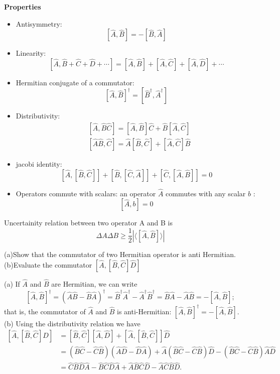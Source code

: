 \textbf{Properties}\\
\begin{itemize}
	\item Antisymmetry:\\
	$$[\hat{A}, \hat{B}]=-[\hat{B}, \hat{A}]$$
	\item Linearity:\\
	 $$[\hat{A}, \hat{B}+\hat{C}+\hat{D}+\cdots]=[\hat{A}, \hat{B}]+[\hat{A}, \hat{C}]+[\hat{A}, \hat{D}]+\cdots$$
	 \item  Hermitian conjugate of a commutator: \\
	 $$[\hat{A}, \hat{B}]^{\dagger}=\left[\hat{B}^{\dagger}, \hat{A}^{\dagger}\right]$$
	 \item  Distributivity: \\
	 $$\begin{aligned}
	 	&{[\hat{A}, \hat{B} \hat{C}]=[\hat{A}, \hat{B}] \hat{C}+\hat{B}[\hat{A}, \hat{C}]} \\
	 	&{[\hat{A} \hat{B}, \hat{C}]=\hat{A}[\hat{B}, \hat{C}]+[\hat{A}, \hat{C}] \hat{B}}
	 \end{aligned}$$
	 \item jacobi identity:\\
	 $$[\hat{A},[\hat{B}, \hat{C}]]+[\hat{B},[\hat{C}, \hat{A}]]+[\hat{C},[\hat{A}, \hat{B}]]=0$$
	 \item Operators commute with scalars: an operator $\hat{A}$ commutes with any scalar $b$ :
	 $$
	 [\hat{A}, b]=0
	 $$
\end{itemize}
\begin{note}
	Uncertainity relation between two operator A  and B is \\
	$$\Delta A \Delta B \geq \frac{1}{2}\left| \langle \left[ \hat{A},\hat{B}\right] \rangle \right| $$
\end{note}
\begin{exercise}
	(a)Show that the commutator of two Hermitian operator is anti Hermitian.\\
	(b)Evaluate the commutator $\left[ \hat{A},\left[ \hat{B},\hat{C}\right] \hat{D}\right] $
\end{exercise}
\begin{answer}
	(a) If $\hat{A}$ and $\hat{B}$ are Hermitian, we can write
	$$
	[\hat{A}, \hat{B}]^{\dagger}=(\hat{A} \hat{B}-\hat{B} \hat{A})^{\dagger}=\hat{B}^{\dagger} \hat{A}^{\dagger}-\hat{A}^{\dagger} \hat{B}^{\dagger}=\hat{B} \hat{A}-\hat{A} \hat{B}=-[\hat{A}, \hat{B}] ;
	$$
	that is, the commutator of $\hat{A}$ and $\hat{B}$ is anti-Hermitian: $[\hat{A}, \hat{B}]^{\dagger}=-[\hat{A}, \hat{B}]$.\\
	(b) Using the distributivity relation we have
	$$
	\begin{aligned}
	[\hat{A},[\hat{B}, \hat{C}] \hat{D}] &=[\hat{B}, \hat{C}][\hat{A}, \hat{D}]+[\hat{A},[\hat{B}, \hat{C}]] \hat{D} \\
	&=(\hat{B} \hat{C}-\hat{C} \hat{B})(\hat{A} \hat{D}-\hat{D} \hat{A})+\hat{A}(\hat{B} \hat{C}-\hat{C} \hat{B}) \hat{D}-(\hat{B} \hat{C}-\hat{C} \hat{B}) \hat{A} \hat{D} \\
	&=\hat{C} \hat{B} \hat{D} \hat{A}-\hat{B} \hat{C} \hat{D} \hat{A}+\hat{A} \hat{B} \hat{C} \hat{D}-\hat{A} \hat{C} \hat{B} \hat{D} .
	\end{aligned}
	$$
\end{answer}
